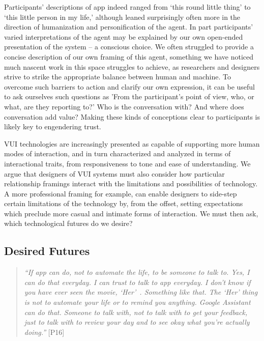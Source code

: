             Participants' descriptions of \acl{app} indeed ranged from `this round little thing' to `this little person in my life,' although leaned surprisingly often more in the direction of humanization and personification of the agent. In part participants' varied interpretations of the agent may be explained by our own open-ended presentation of the system -- a conscious choice. We often struggled to provide a concise description of our own framing of this agent, something we have noticed much nascent work in this space struggles to achieve, as researchers and designers strive to strike the appropriate balance between human and machine. To overcome such barriers to action and clarify our own expression, it can be useful to ask ourselves such questions as 'From the participant's point of view, who, or what, are they reporting to?' Who is the conversation with? And where does conversation add value? Making these kinds of conceptions clear to participants is likely key to engendering trust.

            \ac{VUI} technologies are increasingly presented as capable of supporting more human modes of interaction, and in turn characterized and analyzed in terms of interactional traits, from responsiveness to tone and ease of understanding. We argue that designers of \ac{VUI} systems must also consider how particular relationship framings interact with the limitations and possibilities of technology. A more professional framing for example, can enable designers to side-step certain limitations of the technology by, from the offset, setting expectations which preclude more casual and intimate forms of interaction. We must then ask, which technological futures do we desire?

    \subsection{Desired Futures} %
    
        \begin{quote}
        \vspace{2mm}
            \textit{``If \acl{app} can do, not to automate the life, to be someone to talk to. Yes, I can do that everyday. I can trust to talk to \acl{app} everyday. I don't know if you have ever seen the movie, `Her'~\cite{spike2014her}. Something like that. The `Her' thing is not to automate your life or to remind you anything. Google Assistant can do that. Someone to talk with, not to talk with to get your feedback, just to talk with to review your day and to see okay what you're actually doing.''} [P16]
        \vspace{2mm}
        \end{quote} 
    
